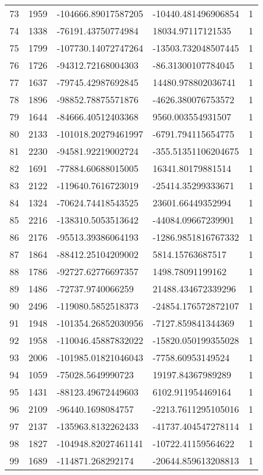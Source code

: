 \begin{longtable}{lllll}
    73 & 1959 & -104666.89017587205 & -10440.481496906854 & 1 \\
    74 & 1338 & -76191.43750774984 & 18034.97117121535 & 1 \\
    75 & 1799 & -107730.14072747264 & -13503.732048507445 & 1 \\
    76 & 1726 & -94312.72168004303 & -86.31300107784045 & 1 \\
    77 & 1637 & -79745.42987692845 & 14480.978802036741 & 1 \\
    78 & 1896 & -98852.78875571876 & -4626.380076753572 & 1 \\
    79 & 1644 & -84666.40512403368 & 9560.003554931507 & 1 \\
    80 & 2133 & -101018.20279461997 & -6791.794115654775 & 1 \\
    81 & 2230 & -94581.92219002724 & -355.51351106204675 & 1 \\
    82 & 1691 & -77884.60688015005 & 16341.80179881514 & 1 \\
    83 & 2122 & -119640.7616723019 & -25414.35299333671 & 1 \\
    84 & 1324 & -70624.74418543525 & 23601.66449352994 & 1 \\
    85 & 2216 & -138310.5053513642 & -44084.09667239901 & 1 \\
    86 & 2176 & -95513.39386064193 & -1286.9851816767332 & 1 \\
    87 & 1864 & -88412.25104209002 & 5814.15763687517 & 1 \\
    88 & 1786 & -92727.62776697357 & 1498.78091199162 & 1 \\
    89 & 1486 & -72737.9740066259 & 21488.434672339296 & 1 \\
    90 & 2496 & -119080.5852518373 & -24854.176572872107 & 1 \\
    91 & 1948 & -101354.26852030956 & -7127.859841344369 & 1 \\
    92 & 1958 & -110046.45887832022 & -15820.050199355028 & 1 \\
    93 & 2006 & -101985.01821046043 & -7758.60953149524 & 1 \\
    94 & 1059 & -75028.5649990723 & 19197.84367989289 & 1 \\
    95 & 1431 & -88123.49672449603 & 6102.911954469164 & 1 \\
    96 & 2109 & -96440.1698084757 & -2213.7611295105016 & 1 \\
    97 & 2137 & -135963.8132262433 & -41737.404547278114 & 1 \\
    98 & 1827 & -104948.82027461141 & -10722.41159564622 & 1 \\
    99 & 1689 & -114871.268292174 & -20644.859613208813 & 1
\end{longtable}